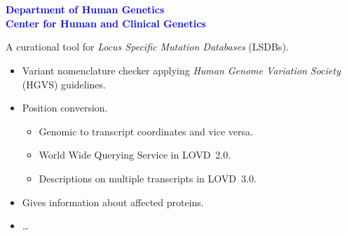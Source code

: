 \documentclass[a4, portrait]{seminar}
\begin{document}

\begin{slide}
  \setcounter{slide}{0}
  \vspace*{1.5cm}
  \begin{center}
  {\bf\Large{\myTitle}}\\
  \vfill
  \textcolor{Blue}{
    {\bf
      \small{\me}\\
      \small{Department of Human Genetics}\\
      \small{Center for Human and Clinical Genetics}
    }
  }
  \vspace{1.1cm}
  \end{center}
\end{slide}



\begin{slide}
  
  A curational tool for \emph{Locus Specific Mutation Databases} (LSDBs).
  
  \bigskip
  \begin{itemize}
    \item Variant nomenclature checker applying \emph{Human Genome Variation
          Society} (HGVS) guidelines.
    \item Position conversion.
    \begin{itemize}
      \item Genomic to transcript coordinates and vice versa.
      \item World Wide Querying Service in LOVD~2.0.
      \item Descriptions on multiple transcripts in LOVD~3.0.
    \end{itemize}
    \item Gives information about affected proteins.
    \item \ldots
  \end{itemize}
  \vfill
\end{slide}
\end{document}
